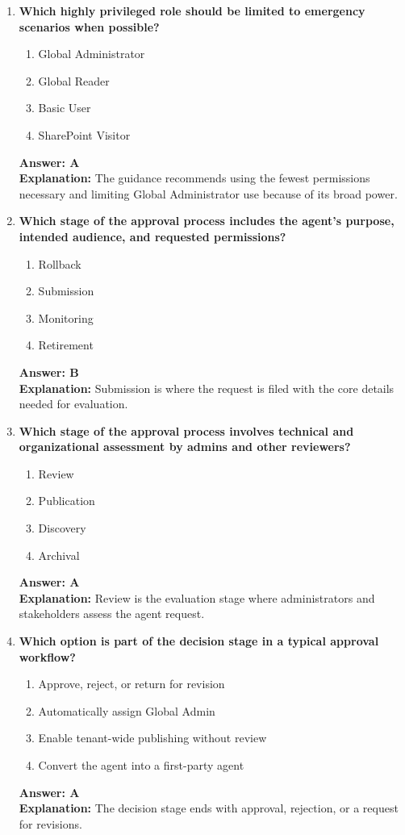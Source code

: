 \documentclass[10pt]{article}
\begin{document}
\begin{enumerate}[leftmargin=*]
\item \textbf{Which highly privileged role should be limited to emergency scenarios when possible?}
\begin{enumerate}[label=\Alph*.]
  \item Global Administrator
  \item Global Reader
  \item Basic User
  \item SharePoint Visitor
\end{enumerate}
\textbf{Answer: A}\\
\textbf{Explanation:} The guidance recommends using the fewest permissions necessary and limiting Global Administrator use because of its broad power.

\item \textbf{Which stage of the approval process includes the agent's purpose, intended audience, and requested permissions?}
\begin{enumerate}[label=\Alph*.]
  \item Rollback
  \item Submission
  \item Monitoring
  \item Retirement
\end{enumerate}
\textbf{Answer: B}\\
\textbf{Explanation:} Submission is where the request is filed with the core details needed for evaluation.

\item \textbf{Which stage of the approval process involves technical and organizational assessment by admins and other reviewers?}
\begin{enumerate}[label=\Alph*.]
  \item Review
  \item Publication
  \item Discovery
  \item Archival
\end{enumerate}
\textbf{Answer: A}\\
\textbf{Explanation:} Review is the evaluation stage where administrators and stakeholders assess the agent request.

\item \textbf{Which option is part of the decision stage in a typical approval workflow?}
\begin{enumerate}[label=\Alph*.]
  \item Approve, reject, or return for revision
  \item Automatically assign Global Admin
  \item Enable tenant-wide publishing without review
  \item Convert the agent into a first-party agent
\end{enumerate}
\textbf{Answer: A}\\
\textbf{Explanation:} The decision stage ends with approval, rejection, or a request for revisions.


\end{enumerate}
\end{document}

